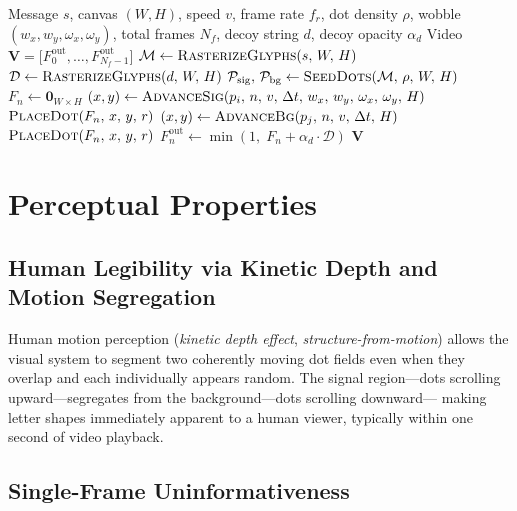 \documentclass[12pt,a4paper]{article}
\begin{document}
\begin{algorithm}[H]
\caption{Ghost Font Video Encoding}
\begin{algorithmic}[1]
\Require Message $s$, canvas $(W,H)$, speed $v$, frame rate $f_r$,
  dot density $\rho$, wobble $(w_x,w_y,\omega_x,\omega_y)$,
  total frames $N_f$, decoy string $d$, decoy opacity $\alpha_d$
\Ensure Video $\mathbf{V} = \bigl[F_0^{\mathrm{out}},\ldots,F_{N_f-1}^{\mathrm{out}}\bigr]$
\State $\mathcal{M} \leftarrow \textsc{RasterizeGlyphs}(s,\,W,\,H)$
\State $\mathcal{D} \leftarrow \textsc{RasterizeGlyphs}(d,\,W,\,H)$
\State $\mathcal{P}_{\mathrm{sig}},\,\mathcal{P}_{\mathrm{bg}} \leftarrow \textsc{SeedDots}(\mathcal{M},\,\rho,\,W,\,H)$
  \State $F_n \leftarrow \mathbf{0}_{W \times H}$
    \State $(x,y) \leftarrow \textsc{AdvanceSig}(p_i,\,n,\,v,\,\Delta t,\,w_x,\,w_y,\,\omega_x,\,\omega_y,\,H)$
    \State $\textsc{PlaceDot}(F_n,\,x,\,y,\,r)$
  \EndFor
    \State $(x,y) \leftarrow \textsc{AdvanceBg}(p_j,\,n,\,v,\,\Delta t,\,H)$
    \State $\textsc{PlaceDot}(F_n,\,x,\,y,\,r)$
  \EndFor
  \State $F_n^{\mathrm{out}} \leftarrow \min(1,\;F_n + \alpha_d\cdot\mathcal{D})$
\EndFor
\Return $\mathbf{V}$
\end{algorithmic}
\end{algorithm}

\section{Perceptual Properties}

\subsection{Human Legibility via Kinetic Depth and Motion Segregation}

Human motion perception (\emph{kinetic depth effect}, \emph{structure-from-motion})
allows the visual system to segment two coherently moving dot fields even when
they overlap and each individually appears random.  The signal region—dots
scrolling upward—segregates from the background—dots scrolling downward—
making letter shapes immediately apparent to a human viewer, typically within
one second of video playback.

\subsection{Single-Frame Uninformativeness}
\end{document}
